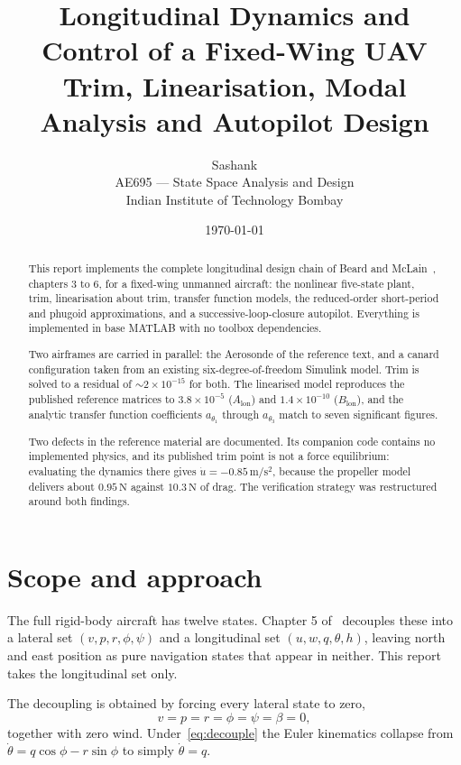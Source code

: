 \documentclass[11pt,a4paper]{article}
\title{\textbf{Longitudinal Dynamics and Control of a Fixed-Wing UAV}\\[2mm]
\large Trim, Linearisation, Modal Analysis and Autopilot Design}
\author{Sashank\\[1mm]\small AE695 --- State Space Analysis and Design\\
\small Indian Institute of Technology Bombay}
\date{\today}
\newcommand{\lon}{\mathrm{lon}}
\begin{document}
\maketitle

\begin{abstract}
\noindent
This report implements the complete longitudinal design chain of Beard and
McLain~\cite{beard}, chapters 3 to 6, for a fixed-wing unmanned aircraft: the
nonlinear five-state plant, trim, linearisation about trim, transfer function
models, the reduced-order short-period and phugoid approximations, and a
successive-loop-closure autopilot. Everything is implemented in base MATLAB with
no toolbox dependencies.

Two airframes are carried in parallel: the Aerosonde of the reference text, and a
canard configuration taken from an existing six-degree-of-freedom Simulink model.
Trim is solved to a residual of $\sim\!2\times10^{-15}$ for both. The linearised
model reproduces the published reference matrices to $3.8\times10^{-5}$
($A_\lon$) and $1.4\times10^{-10}$ ($B_\lon$), and the analytic transfer function
coefficients $a_{\theta_1}$ through $a_{\theta_3}$ match to seven significant
figures.

Two defects in the reference material are documented. Its companion code contains
no implemented physics, and its published trim point is not a force equilibrium:
evaluating the dynamics there gives $\dot u = -0.85\,\mathrm{m/s^2}$, because the
propeller model delivers about $0.95\,\mathrm{N}$ against $10.3\,\mathrm{N}$ of
drag. The verification strategy was restructured around both findings.
\end{abstract}

\tableofcontents
\clearpage

\section{Scope and approach}

The full rigid-body aircraft has twelve states. Chapter 5 of~\cite{beard}
decouples these into a lateral set $(v,p,r,\phi,\psi)$ and a longitudinal set
$(u,w,q,\theta,h)$, leaving north and east position as pure navigation states
that appear in neither. This report takes the longitudinal set only.

The decoupling is obtained by forcing every lateral state to zero,
\begin{equation}
  v = p = r = \phi = \psi = \beta = 0,
  \label{eq:decouple}
\end{equation}
together with zero wind. Under~\eqref{eq:decouple} the Euler kinematics collapse
from $\dot\theta = q\cos\phi - r\sin\phi$ to simply $\dot\theta = q$.
\end{document}
